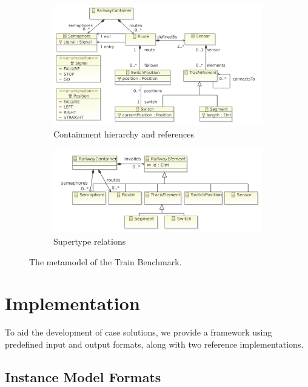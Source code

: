 \documentclass[submission,copyright,creativecommons]{eptcs}
\newcommand{\tb}{Train Benchmark\xspace}
\begin{document}
\begin{figure}[h!]
	\centering
	\begin{subfigure}[b]{\textwidth}
		\centering
		\includegraphics[scale=0.6]{figures/railway-containments}
		\caption{Containment hierarchy and references}
		\label{fig:railway-containments}
	\end{subfigure}
		\begin{subfigure}[b]{\textwidth}
			\centering
			\includegraphics[scale=0.6]{figures/railway-inheritance}
			\caption{Supertype relations}
			\label{fig:railway-inheritance}
		\end{subfigure}
	\caption{The metamodel of the \tb.}
	\label{fig:metamodel}
\end{figure}

\section{Implementation}

To aid the development of case solutions, we provide a framework using predefined input and output formats, along with two reference implementations.

\subsection{Instance Model Formats}
\end{document}
